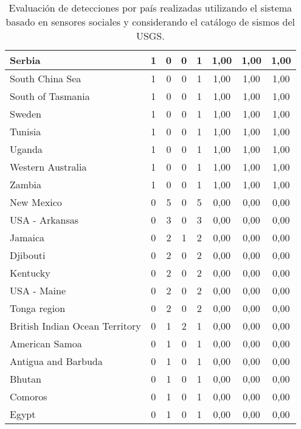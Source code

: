 {\begin{table}[!ht]
\begin{tabular}{|l|ccc|c|ccc|}
Serbia	 & 1 	 & 0   	 & 0   	& 1	 & 1,00 &	1,00 &	1,00 \\ \hline
South China Sea	 & 1 	 & 0   	 & 0   	& 1	 & 1,00 &	1,00 &	1,00 \\ \hline
South of Tasmania	 & 1 	 & 0   	 & 0   	& 1	 & 1,00 &	1,00 &	1,00 \\ \hline
Sweden	 & 1 	 & 0   	 & 0   	& 1	 & 1,00 &	1,00 &	1,00 \\ \hline
Tunisia	 & 1 	 & 0   	 & 0   	& 1	 & 1,00 &	1,00 &	1,00 \\ \hline
Uganda	 & 1 	 & 0   	 & 0   	& 1	 & 1,00 &	1,00 &	1,00 \\ \hline
Western Australia	 & 1 	 & 0   	 & 0   	& 1	 & 1,00 &	1,00 &	1,00 \\ \hline
Zambia	 & 1 	 & 0   	 & 0   	& 1	 & 1,00 &	1,00 &	1,00 \\ \hline
New Mexico	 & 0   	 & 5 	 & 0   	& 5	 & 0,00 &	0,00 &	0,00 \\ \hline
USA - Arkansas	 & 0   	 & 3 	 & 0   	& 3	 & 0,00 &	0,00 &	0,00 \\ \hline
Jamaica	 & 0   	 & 2 	 & 1 	& 2	 & 0,00 &	0,00 &	0,00 \\ \hline
Djibouti	 & 0   	 & 2 	 & 0   	& 2	 & 0,00 &	0,00 &	0,00 \\ \hline
Kentucky	 & 0   	 & 2 	 & 0   	& 2	 & 0,00 &	0,00 &	0,00 \\ \hline
USA - Maine	 & 0   	 & 2 	 & 0   	& 2	 & 0,00 &	0,00 &	0,00 \\ \hline
Tonga region	 & 0   	 & 2 	 & 0   	& 2	 & 0,00 &	0,00 &	0,00 \\ \hline
British Indian Ocean Territory	 & 0   	 & 1 	 & 2 	& 1	 & 0,00 &	0,00 &	0,00 \\ \hline
American Samoa	 & 0   	 & 1 	 & 0   	& 1	 & 0,00 &	0,00 &	0,00 \\ \hline
Antigua and Barbuda	 & 0   	 & 1 	 & 0   	& 1	 & 0,00 &	0,00 &	0,00 \\ \hline
Bhutan	 & 0   	 & 1 	 & 0   	& 1	 & 0,00 &	0,00 &	0,00 \\ \hline
Comoros	 & 0   	 & 1 	 & 0   	& 1	 & 0,00 &	0,00 &	0,00 \\ \hline
Egypt	 & 0   	 & 1 	 & 0   	& 1	 & 0,00 &	0,00 &	0,00 \\ \hline
   \end{tabular}
  \caption{Evaluación de detecciones por país realizadas utilizando el sistema basado en sensores sociales y considerando el catálogo de sismos del USGS.}
  \label{table:all-detections-06}
\end{table}}

